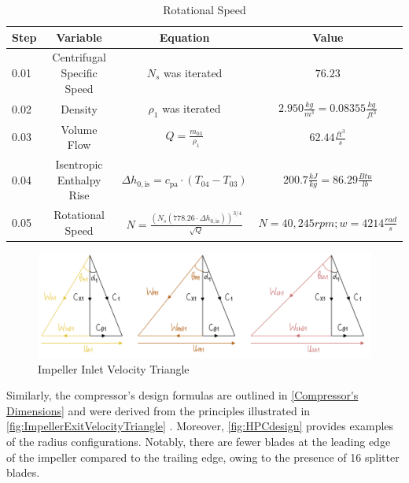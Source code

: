 \documentclass[12pt, letter]{report}
\begin{document}
\begin{table}[H]
    \centering
    \caption{Rotational Speed  \cite{lectureslides}}
    \begin{tabular}{|l|c|c|c|} \hline 
          \textbf{Step} &\textbf{Variable}&  \textbf{Equation}& \textbf{Value}\\ \hline 
          0.01&Centrifugal Specific Speed&   $N_s$ was iterated& $76.23$\\ \hline 
          0.02&Density&  ${\rho_1}$ was iterated& $2.950 \frac{kg}{m^3}=0.08355 \frac{kg}{ft^3}$\\ \hline 
          0.03&Volume Flow&   $Q = \frac{m_{03}}{\rho_1}$& $62.44 \frac{ft^3}{s}$\\ \hline 
          0.04&Isentropic Enthalpy Rise&  $\Delta h_{0,\text{is}} = c_{\text{pa}} \cdot (T_{04} - T_{03})$ & $200.7 \frac{kJ}{kg}=86.29 \frac{Btu}{lb}$\\ \hline 
          0.05&Rotational Speed&  $N=\frac{{(N_s (778.26 \cdot \Delta h_{0,\text{is}}))^{3/4}}}{{\sqrt{Q}}}$& $N=40,245rpm ; w=4214 \frac{rad}{s}$\\ \hline
    \end{tabular}
    \label{Rotational Speed}
\end{table}

\begin{figure}[H]
    \centering
    \includegraphics[width=1\textwidth]{figures/Impeller Inlet Velocity Triangle.png}
    \caption{Impeller Inlet Velocity Triangle \cite{lectureslides}}
    \label{fig:ImpellerInletVelocityTriangle}
\end{figure}

Similarly, the compressor's design formulas are outlined in \autoref{Compressor's Dimensions} and were derived from the principles illustrated in \autoref{fig:ImpellerExitVelocityTriangle} \cite{lectureslides}. Moreover, \autoref{fig:HPCdesign} provides examples of the radius configurations. Notably, there are fewer blades at the leading edge of the impeller compared to the trailing edge, owing to the presence of 16 splitter blades.
\end{document}
